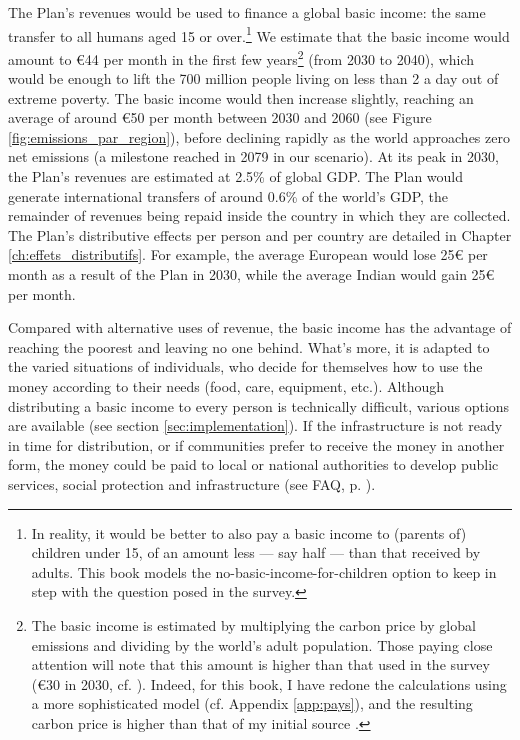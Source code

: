 \documentclass[a5paper,english,openany]{memoir}
\begin{document}
The Plan's revenues would be used to finance a global basic income: the same transfer to all humans aged 15 or over.\footnote{In reality, it would be better to also pay a basic income to (parents of) children under 15, of an amount less --- say half --- than that received by adults. This book models the no-basic-income-for-children option to keep in step with the question posed in the survey.
} 
We estimate that the basic income would amount to \euro{}44 per month in the first few years\footnote{The basic income is estimated by multiplying the carbon price by global emissions and dividing by the world's adult population. Those paying close attention will note that this amount is higher than that used in the survey (\euro{}30 in 2030, cf. \citealp{fabre_global_2023}). Indeed, for this book, I have redone the calculations using a more sophisticated model (cf. Appendix \ref{app:pays}), and the resulting carbon price is higher than that of my initial source \citep{stern_report_2017}.} (from 2030 to 2040), which would be enough to lift the 700 million people living on less than \textit{\texteuro{}}2 a day out of extreme poverty. 
The basic income would then increase slightly, reaching an average of around \euro{}50 per month between 2030 and 2060 (see Figure \ref{fig:emissions_par_region}), before declining rapidly as the world approaches zero net emissions (a milestone reached in 2079 in our scenario). 
At its peak in 2030, the Plan's revenues are estimated at 2.5\% of global GDP. The Plan would generate international transfers of around 0.6\% %
of the world's GDP, the remainder %
of revenues being repaid inside the country in which they are collected. 
The Plan's distributive effects per person and per country are detailed in Chapter \ref{ch:effets_distributifs}. 
For example, the average European %
would lose 25\euro{} per month as a result of the Plan in 2030, while the average Indian would gain 25\euro{} per month. %

Compared with alternative uses of revenue, the basic income has the advantage of reaching the poorest and leaving no one behind. What's more, it is adapted to the varied situations of individuals, who decide for themselves how to use the money according to their needs (food, care, equipment, etc.). 
Although distributing a basic income to every person is technically difficult, various options are available %
(see section \ref{sec:implementation}). If the infrastructure is not ready in time for distribution, or if communities prefer to receive the money in another form, the money could be paid to local or national authorities to develop public services, social protection and infrastructure (see FAQ, p. \pageref{q:rdb}). 
\end{document}
